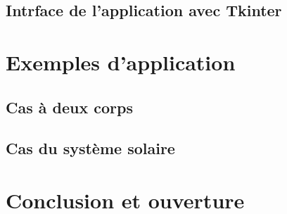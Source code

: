 \documentclass{article}
\begin{document}
    \subsection{Intrface de l'application avec Tkinter}

\section{Exemples d'application}
    \subsection{Cas à deux corps}

    \subsection{Cas du système solaire}

\section{Conclusion et ouverture}
\end{document}
